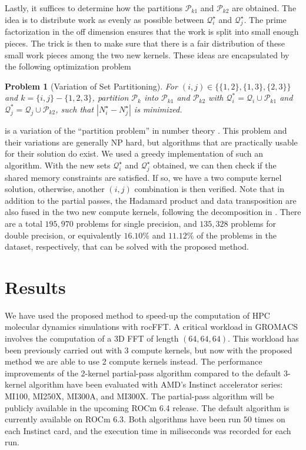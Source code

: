 \documentclass{gtac}
\theoremstyle{problemstyle}
\newtheorem{problem}{Problem}%
\begin{document}
Lastly, it suffices to determine how the partitions $\mathcal{P}_{k1}$ and $\mathcal{P}_{k2}$ are obtained. The idea is to distribute work as evenly as possible between $\mathcal{Q}_i^\star$ and $\mathcal{Q}_j^\star$. The prime factorization in the off dimension ensures that the work is split into small enough pieces. The trick is then to make sure that there is a fair distribution of these small work pieces among the two new kernels. These ideas are encapsulated by the following optimization problem
\begin{problem}[Variation of Set Partitioning]
For $(i,j) \in \bigl \{ \{1,2\}, \{1,3\}, \{2,3\} \bigr \}$ and $k = \{i,j\} - \{1,2,3\}$, partition $\mathcal{P}_k$ into $\mathcal{P}_{k1}$ and $\mathcal{P}_{k2}$ with $\mathcal{Q}_i^* = \mathcal{Q}_i \cup \mathcal{P}_{k1}$ and $\mathcal{Q}_j^* = \mathcal{Q}_j \cup \mathcal{P}_{k2}$, such that $| N_i^\star - N_j^\star |$ is minimized.
\label{prob:set_partitioning}
\end{problem}
 is a variation of the ``partition problem'' in number theory \cite{mertens03}. This problem and their variations are generally NP hard, but algorithms that are practically usable for their solution do exist. We used a greedy implementation of such an algorithm. With the new sets $\mathcal{Q}_i^\star$ and $\mathcal{Q}_j^\star$ obtained, we can then check if the shared memory constraints are satisfied. If so, we have a two compute kernel solution, otherwise, another $(i,j)$ combination is then verified. Note that in addition to the partial passes, the Hadamard product and data transposition are also fused in the two new compute kernels, following the decomposition in . There are a total $195,970$ problems for single precision, and $135,328$ problems for double precision, or equivalently $16.10\%$ and $11.12\%$ of the problems in the dataset, respectively, that can be solved with the proposed method.

\section{Results}
We have used the proposed method to speed-up the computation of HPC
molecular dynamics simulations with rocFFT. A critical workload in
GROMACS \cite{gromacs20} involves the computation of a 3D FFT of
length $(64,64,64)$. This workload has been previously carried out
with 3 compute kernels, but now with the proposed method we are able
to use 2 compute kernels instead. The performance improvements of the
2-kernel partial-pass algorithm compared to the default 3-kernel
algorithm have been evaluated with AMD's Instinct accelerator series:
MI100, MI250X, MI300A, and MI300X. The partial-pass algorithm will be
publicly available in the upcoming ROCm 6.4 release. The default
algorithm is currently available on ROCm 6.3. Both algorithms have
been run $50$ times on each Instinct card, and the execution time in
miliseconds was recorded for each run.
\end{document}
